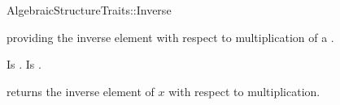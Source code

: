 \begin{ccRefFunctionObjectConcept}{AlgebraicStructureTraits::Inverse}

\ccDefinition

 providing the inverse element with 
respect to multiplication of a . 

\ccRefines 


\ccTypes
{} 
        { Is .}
        { Is .}

\ccOperations
{}
        { returns  the inverse element of $x$ with respect to multiplication. 
        }


\ccSeeAlso


\end{ccRefFunctionObjectConcept} 
